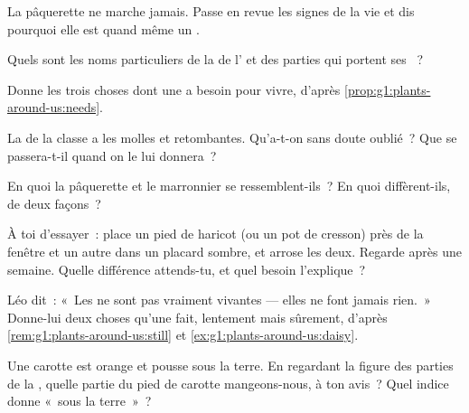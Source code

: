 \begin{exercise}[$\star$]\label{exo:g1:plants-around-us:3}
La pâquerette ne marche jamais. Passe en revue les signes de la vie
et dis pourquoi elle est quand même un .
\end{exercise}

\begin{exercise}[$\star$]\label{exo:g1:plants-around-us:4}
Quels sont les noms particuliers de la  de l' et des
parties qui portent ses ~?
\end{exercise}

\begin{exercise}[$\star$]\label{exo:g1:plants-around-us:5}
Donne les trois choses dont une  a besoin pour vivre, d'après
\cref{prop:g1:plants-around-us:needs}.
\end{exercise}

\begin{exercise}[$\star$]\label{exo:g1:plants-around-us:6}
La  de la classe a les  molles et retombantes. Qu'a-t-on
sans doute oublié~? Que se passera-t-il quand on le lui donnera~?
\end{exercise}

\begin{exercise}[$\star$]\label{exo:g1:plants-around-us:7}
En quoi la pâquerette et le marronnier se ressemblent-ils~? En quoi
diffèrent-ils, de deux façons~?
\end{exercise}

\begin{exercise}[$\star$]\label{exo:g1:plants-around-us:8}
À toi d'essayer~: place un pied de haricot (ou un pot de cresson)
près de la fenêtre et un autre dans un placard sombre, et arrose les
deux. Regarde après une semaine. Quelle différence attends-tu, et
quel besoin l'explique~?
\end{exercise}

\begin{exercise}[$\star\star$]\label{exo:g1:plants-around-us:9}
Léo dit~: «~Les  ne sont pas vraiment vivantes --- elles ne
font jamais rien.~» Donne-lui deux choses qu'une  fait,
lentement mais sûrement, d'après
\cref{rem:g1:plants-around-us:still} et
\cref{ex:g1:plants-around-us:daisy}.
\end{exercise}

\begin{exercise}[$\star\star$]\label{exo:g1:plants-around-us:10}
Une carotte est orange et pousse sous la terre. En regardant la
figure des parties de la , quelle partie du pied de carotte
mangeons-nous, à ton avis~? Quel indice donne «~sous la terre~»~?
\end{exercise}
